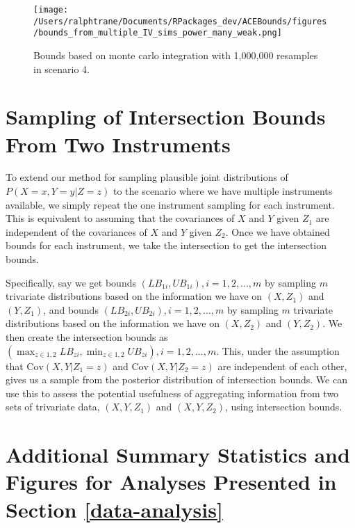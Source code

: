 \documentclass[
]{article}
\theoremstyle{plain}
\begin{document}
\clearpage

\begin{sidewaysfigure}
  \centering
  \texttt{[image: /Users/ralphtrane/Documents/RPackages\_dev/ACEBounds/figures/bounds\_from\_multiple\_IV\_sims\_power\_many\_weak.png]}
  \caption{Bounds based on monte carlo integration with 1,000,000 resamples in scenario 4.}
  \label{fig:bounds_from_multiple_IV_sims_power_many_weak}
\end{sidewaysfigure}

\clearpage

\hypertarget{sampling-of-intersection-bounds-from-two-instruments}{%
\section{\texorpdfstring{Sampling of Intersection Bounds From Two Instruments \label{sample-intersection-bounds}}{Sampling of Intersection Bounds From Two Instruments }}\label{sampling-of-intersection-bounds-from-two-instruments}}

To extend our method for sampling plausible joint distributions of \(P(X = x, Y = y | Z = z)\) to the scenario where we have multiple instruments available, we simply repeat the one instrument sampling for each instrument. This is equivalent to assuming that the covariances of \(X\) and \(Y\) given \(Z_1\) are independent of the covariances of \(X\) and \(Y\) given \(Z_2\). Once we have obtained bounds for each instrument, we take the intersection to get the intersection bounds.

Specifically, say we get bounds \((LB_{1i},UB_{1i}),i = 1,2,...,m\) by sampling \(m\) trivariate distributions based on the information we have on \((X,Z_1)\) and \((Y,Z_1)\), and bounds \((LB_{2i}, UB_{2i}),i = 1,2,...,m\) by sampling \(m\) trivariate distributions based on the information we have on \((X,Z_2)\) and \((Y,Z_2)\). We then create the intersection bounds as \(\left(\max_{z \in {1,2}} LB_{zi}, \min_{z \in {1,2}} UB_{zi}\right), i = 1, 2, ..., m\). This, under the assumption that \(\text{Cov}(X, Y | Z_1 = z)\) and \(\text{Cov}(X, Y | Z_2 = z)\) are independent of each other, gives us a sample from the posterior distribution of intersection bounds. We can use this to assess the potential usefulness of aggregating information from two sets of trivariate data, \((X, Y, Z_1)\) and \((X, Y, Z_2)\), using intersection bounds.

\hypertarget{additional-summary-statistics-and-figures-for-analyses-presented-in-section}{%
\section{\texorpdfstring{Additional Summary Statistics and Figures for Analyses Presented in Section \ref{data-analysis} \label{more-details-data-application-appendix}}{Additional Summary Statistics and Figures for Analyses Presented in Section  }}\label{additional-summary-statistics-and-figures-for-analyses-presented-in-section}}
\end{document}
